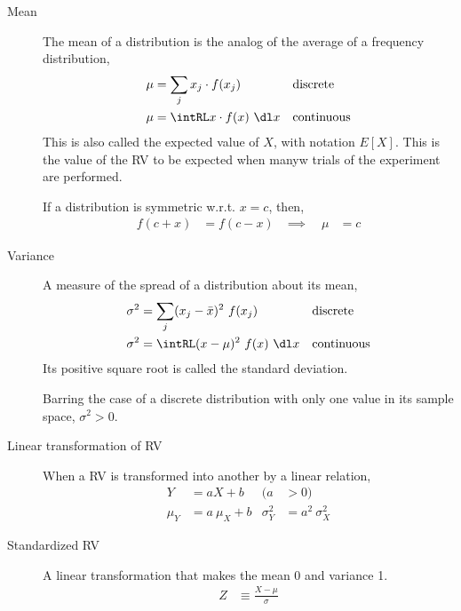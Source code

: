 \begin{description}
    \item[Mean] The mean of a distribution is the analog of the average of a
          frequency distribution,
          \begin{align}
              \mu & = \sum_j x_j \cdot f(x_j)    &  & \text{discrete}   \\
              \mu & = \intRL x \cdot f(x)\ \dl x &  & \text{continuous}
          \end{align}
          This is also called the expected value of $ X $, with notation $ E[X] $.
          This is the value of the RV to be expected when manyw trials
          of the experiment are performed. \par
          If a distribution is symmetric w.r.t. $ x = c $, then,
          \begin{align}
              f(c+x) & = f(c-x) & \implies \quad \mu & = c
          \end{align}

    \item[Variance] A measure of the spread of a distribution about its mean,
          \begin{align}
              \sigma^2 & = \sum_j (x_j - \bar{x})^2\ f(x_j) &  & \text{discrete}   \\
              \sigma^2 & = \intRL (x-\mu)^2\ f(x)\ \dl x    &  & \text{continuous}
          \end{align}
          Its positive square root is called the standard deviation. \par
          Barring the case of a discrete distribution with only one value in its sample
          space, $ \sigma^2 > 0 $.

    \item[Linear transformation of RV] When a RV is transformed into another by a
          linear relation,
          \begin{align}
              Y     & = aX + b       & (a         & > 0)              \\
              \mu_Y & = a\ \mu_X + b & \sigma^2_Y & = a^2\ \sigma^2_X
          \end{align}

    \item[Standardized RV] A linear transformation that makes the mean 0 and
          variance 1.
          \begin{align}
              Z & \equiv \frac{X - \mu}{\sigma}
          \end{align}


\end{description}
